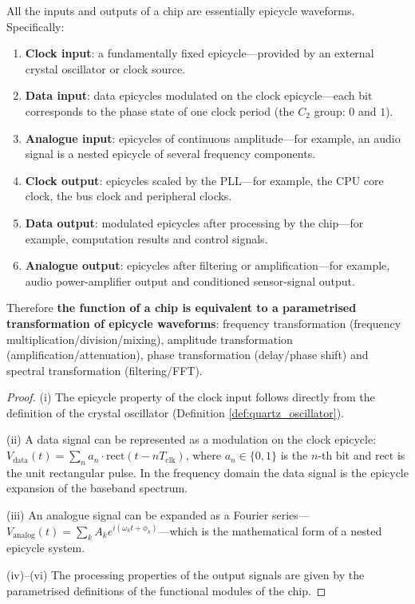 \begin{proposition}\label{prop:chip_io_epicycle}
All the inputs and outputs of a chip are essentially epicycle waveforms. Specifically:
\begin{enumerate}[label=(\roman*)]
    \item \textbf{Clock input}: a fundamentally fixed epicycle---provided by an external crystal oscillator or clock source.
    \item \textbf{Data input}: data epicycles modulated on the clock epicycle---each bit corresponds to the phase state of one clock period (the $C_2$ group: $0$ and $1$).
    \item \textbf{Analogue input}: epicycles of continuous amplitude---for example, an audio signal is a nested epicycle of several frequency components.
    \item \textbf{Clock output}: epicycles scaled by the PLL---for example, the CPU core clock, the bus clock and peripheral clocks.
    \item \textbf{Data output}: modulated epicycles after processing by the chip---for example, computation results and control signals.
    \item \textbf{Analogue output}: epicycles after filtering or amplification---for example, audio power-amplifier output and conditioned sensor-signal output.
\end{enumerate}
Therefore \textbf{the function of a chip is equivalent to a parametrised transformation of epicycle waveforms}: frequency transformation (frequency multiplication/division/mixing), amplitude transformation (amplification/attenuation), phase transformation (delay/phase shift) and spectral transformation (filtering/FFT).
\end{proposition}

\begin{proof}
(i) The epicycle property of the clock input follows directly from the definition of the crystal oscillator (Definition \ref{def:quartz_oscillator}).

(ii) A data signal can be represented as a modulation on the clock epicycle: $V_{\text{data}}(t) = \sum_n a_n \cdot \text{rect}(t - nT_{\text{clk}})$, where $a_n \in \{0, 1\}$ is the $n$-th bit and $\text{rect}$ is the unit rectangular pulse. In the frequency domain the data signal is the epicycle expansion of the baseband spectrum.

(iii) An analogue signal can be expanded as a Fourier series---$V_{\text{analog}}(t) = \sum_k A_k e^{i(\omega_k t + \phi_k)}$---which is the mathematical form of a nested epicycle system.

(iv)--(vi) The processing properties of the output signals are given by the parametrised definitions of the functional modules of the chip.
\end{proof}


